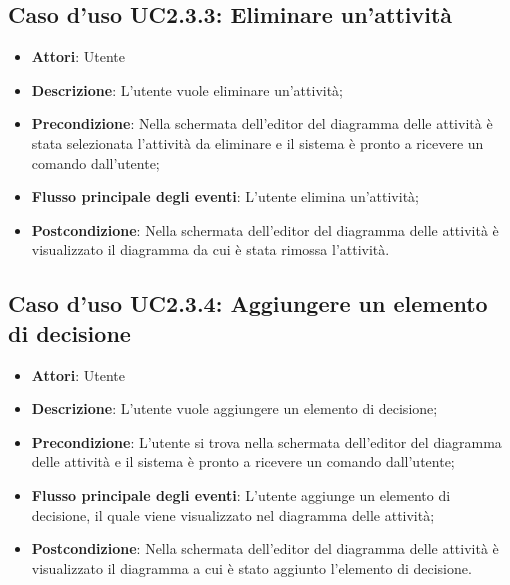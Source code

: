 \documentclass[../AnalisiDeiRequisiti.tex]{subfiles}
\begin{document}
					\subsection{Caso d'uso UC2.3.3: Eliminare un'attività}
					\begin{itemize}
						\item \textbf{Attori}: Utente
						\item \textbf{Descrizione}: L'utente vuole eliminare un'attività;
						\item \textbf{Precondizione}: Nella schermata dell'editor del diagramma delle attività è stata selezionata l'attività da eliminare e il sistema è pronto a ricevere un comando dall'utente;
						\item \textbf{Flusso principale degli eventi}: L'utente elimina un'attività;
						\item \textbf{Postcondizione}: Nella schermata dell'editor del diagramma delle attività è visualizzato il diagramma da cui è stata rimossa l'attività.
					\end{itemize}
					\subsection{Caso d'uso UC2.3.4: Aggiungere un elemento di decisione}
					\begin{itemize}
						\item \textbf{Attori}: Utente
						\item \textbf{Descrizione}: L'utente vuole aggiungere un elemento di decisione;
						\item \textbf{Precondizione}: L'utente si trova nella schermata dell'editor del diagramma delle attività e il sistema è pronto a ricevere un comando dall'utente;
						\item \textbf{Flusso principale degli eventi}: L'utente aggiunge un elemento di decisione, il quale viene visualizzato nel diagramma delle attività;
						\item \textbf{Postcondizione}: Nella schermata dell'editor del diagramma delle attività è visualizzato il diagramma a cui è stato aggiunto l'elemento di decisione.
					\end{itemize}
\end{document}
